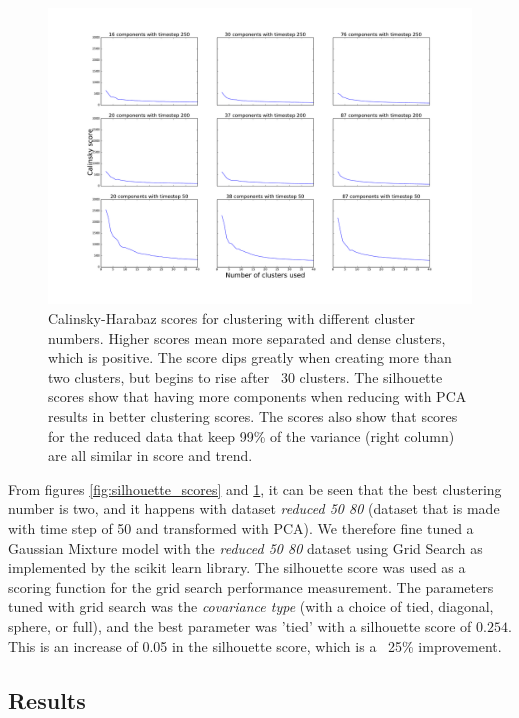 \begin{figure}[H]
  \centering
  \includegraphics[width=\linewidth]{figures/calinsky_scores.pdf}
  \caption{Calinsky-Harabaz scores for clustering with different cluster numbers. Higher scores mean more separated and dense clusters, which is positive. The score dips greatly when creating more than two clusters, but begins to rise after ~30 clusters. The silhouette scores show that having more components when reducing with PCA results in better clustering scores. The scores also show that scores for the reduced data that keep 99\% of the variance (right column) are all similar in score and trend.}
  \label{fig:calinsky_scores}
\end{figure}

From figures \ref{fig:silhouette_scores} and \ref{fig:calinsky_scores}, it can be seen that the best clustering number is two, and it happens with dataset \textit{reduced 50 80} (dataset that is made with time step of 50 and transformed with PCA). We therefore fine tuned a Gaussian Mixture model with the \textit{reduced 50 80} dataset using Grid Search as implemented by the scikit learn library. The silhouette score was used as a scoring function for the grid search performance measurement. The parameters tuned with grid search was the \textit{covariance type} (with a choice of tied, diagonal, sphere, or full), and the best parameter was 'tied' with a silhouette score of $0.254$. This is an increase of 0.05 in the silhouette score, which is a ~25\% improvement.

\subsection{Results}

